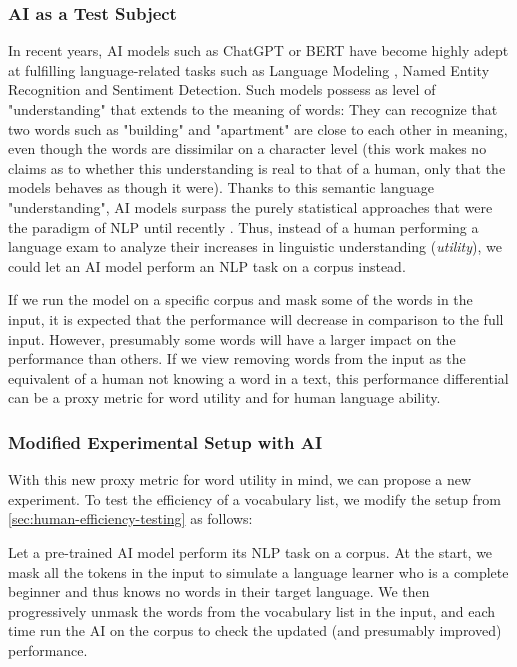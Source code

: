 \subsubsection{AI as a Test Subject} \label{sec:ai-as-test-subject}
In recent years, AI models such as ChatGPT  or BERT  have become highly adept at fulfilling language-related tasks such as Language Modeling , Named Entity Recognition and Sentiment Detection.
Such models possess as level of "understanding" that extends to the meaning of words:
They can recognize that two words such as "building" and "apartment" are close to each other in meaning, even though the words are dissimilar on a character level (this work makes no claims as to whether this understanding is real to that of a human, only that the models behaves as though it were).
Thanks to this semantic language "understanding", AI models surpass the purely statistical approaches that were the paradigm of NLP until recently \cite{jurafskySpeechLanguageProcessing2025a}.
Thus, instead of a human performing a language exam to analyze their increases in linguistic understanding (\textit{utility}), we could let an AI model perform an NLP task on a corpus instead.

If we run the model on a specific corpus and mask some of the words in the input, it is expected that the performance will decrease in comparison to the full input.
However, presumably some words will have a larger impact on the performance than others.
If we view removing words from the input as the equivalent of a human not knowing a word in a text, this performance differential can be a proxy metric for word utility and for human language ability.

\subsubsection{Modified Experimental Setup with AI}
With this new proxy metric for word utility in mind, we can propose a new experiment.
To test the efficiency of a vocabulary list, we modify the setup from \ref{sec:human-efficiency-testing} as follows:

Let a pre-trained AI model perform its NLP task on a corpus.
At the start, we mask all the tokens in the input to simulate a language learner who is a complete beginner and thus knows no words in their target language.
We then progressively unmask the words from the vocabulary list in the input, and each time run the AI on the corpus to check the updated (and presumably improved) performance.

